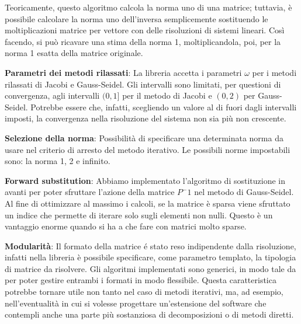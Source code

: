 \begin{itemize}
\begin{item}
			Teoricamente, questo algoritmo calcola la norma uno di una matrice; tuttavia, è possibile calcolare la norma uno dell'inversa semplicemente sostituendo le moltiplicazioni matrice per vettore con delle risoluzioni di sistemi lineari. Così facendo, si può ricavare una stima della norma 1, moltiplicandola, poi, per la norma 1 esatta della matrice originale.
			\end{item}
	\begin{item}
		\textbf{Parametri dei metodi rilassati}: La libreria accetta i parametri $\omega$ per i metodi rilassati di Jacobi e Gauss-Seidel. Gli intervalli sono limitati, per questioni di convergenza, agli intervalli $(0, 1]$ per il metodo di Jacobi e $(0, 2)$ per Gauss-Seidel. Potrebbe essere che, infatti, scegliendo un valore al di fuori dagli intervalli imposti, la convergenza nella risoluzione del sistema non sia più non crescente.
	\end{item}
	\begin{item}
		\textbf{Selezione della norma}: Possibilità di specificare una determinata norma da usare nel criterio di arresto del metodo iterativo. Le possibili norme impostabili sono: la norma 1, 2 e infinito.
	\end{item}
	\begin{item}
		\textbf{Forward substitution}: Abbiamo implementato l'algoritmo di sostituzione in avanti per poter sfruttare l'azione della matrice $P^-1$ nel metodo di Gauss-Seidel. Al fine di ottimizzare al massimo i calcoli, se la matrice è sparsa viene sfruttato un indice che permette di iterare solo sugli elementi non nulli. Questo è un vantaggio enorme quando si ha a che fare con matrici molto sparse.
	\end{item}
	\begin{item}
		\textbf{Modularità}: Il formato della matrice é stato reso indipendente dalla risoluzione, infatti nella libreria è possibile specificare, come parametro templato, la tipologia di matrice da risolvere. Gli algoritmi implementati sono generici, in modo tale da per poter gestire entrambi i formati in modo flessibile. Questa caratteristica potrebbe tornare utile non tanto nel caso di metodi iterativi, ma, ad esempio, nell'eventualità in cui si volesse progettare un'estensione del software che contempli anche una parte più sostanziosa di decomposizioni o di metodi diretti.
		

\end{item}
\end{itemize}

